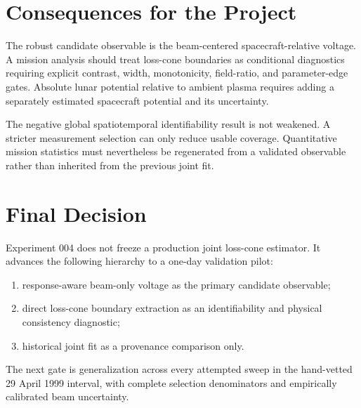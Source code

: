 \documentclass[11pt]{article}
\begin{document}
\section{Consequences for the Project}

The robust candidate observable is the beam-centered spacecraft-relative
voltage.  A mission analysis should treat loss-cone boundaries as conditional
diagnostics requiring explicit contrast, width, monotonicity, field-ratio, and
parameter-edge gates.  Absolute lunar potential relative to ambient plasma
requires adding a separately estimated spacecraft potential and its uncertainty.

The negative global spatiotemporal identifiability result is not weakened.  A
stricter measurement selection can only reduce usable coverage.  Quantitative
mission statistics must nevertheless be regenerated from a validated observable
rather than inherited from the previous joint fit.

\section{Final Decision}

Experiment 004 does not freeze a production joint loss-cone estimator.  It
advances the following hierarchy to a one-day validation pilot:
\begin{enumerate}
  \item response-aware beam-only voltage as the primary candidate observable;
  \item direct loss-cone boundary extraction as an identifiability and physical
        consistency diagnostic;
  \item historical joint fit as a provenance comparison only.
\end{enumerate}
The next gate is generalization across every attempted sweep in the hand-vetted
29 April 1999 interval, with complete selection denominators and empirically
calibrated beam uncertainty.
\end{document}
